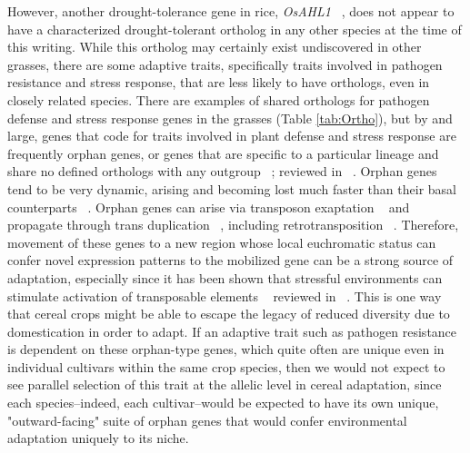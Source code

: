 \documentclass[12pt]{article}
\begin{document}
However, another drought-tolerance gene in rice, \textit{OsAHL1} ~\citep{Zhou2016}, does not appear to have a characterized drought-tolerant ortholog in any other species at the time of this writing.
While this ortholog may certainly exist undiscovered in other grasses, there are some adaptive traits, specifically traits involved in pathogen resistance and stress response, that are less likely to have orthologs, even in closely related species.
There are examples of shared orthologs for pathogen defense and stress response genes in the grasses (Table \ref{tab:Ortho}), but by and large, genes that code for traits involved in plant defense and stress response are frequently orphan genes, or genes that are specific to a particular lineage and share no defined orthologs with any outgroup ~\citep{Woodhouse2011}; reviewed in ~\citep{Arendsee2014}.
Orphan genes tend to be very dynamic, arising and becoming lost much faster than their basal counterparts ~\citep{Freeling2008}.
Orphan genes can arise via transposon exaptation ~\citep{Donoghue2011} and propagate through trans duplication ~\citep{Freeling2008, Arendsee2014}, including retrotransposition ~\citep{Wang2006}. 
Therefore, movement of these genes to a new region whose local euchromatic status can confer novel expression patterns to the mobilized gene can be a strong source of adaptation, especially since it has been shown that stressful environments can stimulate activation of transposable elements ~\citep{Beguiristain2001, Makarevitch2015}  reviewed in ~\citep{Negi2016}. 
This is one way that cereal crops might be able to escape the legacy of reduced diversity due to domestication in order to adapt. 
If an adaptive trait such as pathogen resistance is dependent on these orphan-type genes, which quite often are unique even in individual cultivars within the same crop species, then we would not expect to see parallel selection of this trait at the allelic level in cereal adaptation, since each species--indeed, each cultivar--would be expected to have its own unique, "outward-facing" suite of orphan genes that would confer environmental adaptation uniquely to its niche.
\end{document}
